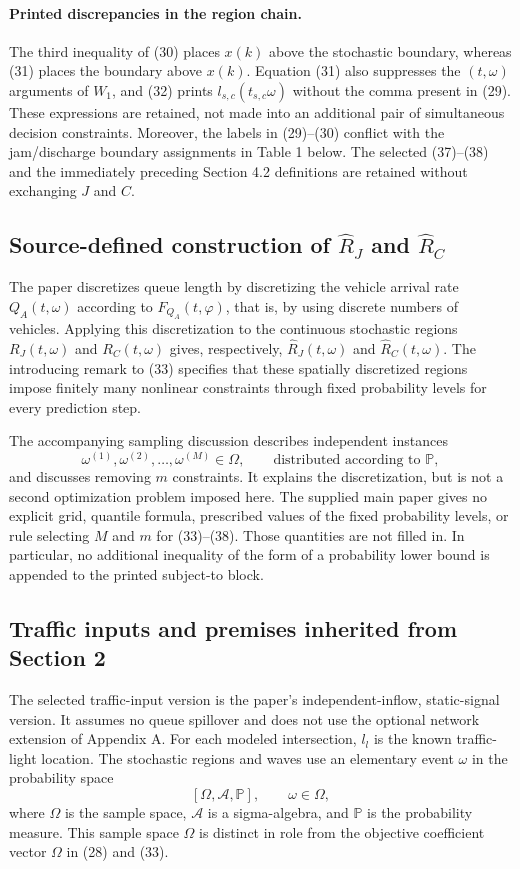 \documentclass{article}
\begin{document}
\paragraph{Printed discrepancies in the region chain.}
The third inequality of (30) places \(x(k)\) above the stochastic boundary, whereas (31) places the boundary above \(x(k)\). Equation (31) also suppresses the \((t,\omega)\) arguments of \(W_1\), and (32) prints \(l_{s,c}(t_{s,c}\omega)\) without the comma present in (29). These expressions are retained, not made into an additional pair of simultaneous decision constraints. Moreover, the labels in (29)--(30) conflict with the jam/discharge boundary assignments in Table 1 below. The selected (37)--(38) and the immediately preceding Section 4.2 definitions are retained without exchanging \(J\) and \(C\).

\subsection*{Source-defined construction of \(\hat R_J\) and \(\hat R_C\)}
The paper discretizes queue length by discretizing the vehicle arrival rate \(Q_A(t,\omega)\) according to \(F_{Q_A}(t,\varphi)\), that is, by using discrete numbers of vehicles. Applying this discretization to the continuous stochastic regions \(R_J(t,\omega)\) and \(R_C(t,\omega)\) gives, respectively, \(\hat R_J(t,\omega)\) and \(\hat R_C(t,\omega)\). The introducing remark to (33) specifies that these spatially discretized regions impose finitely many nonlinear constraints through fixed probability levels for every prediction step.

The accompanying sampling discussion describes independent instances
\[
\omega^{(1)},\omega^{(2)},\ldots,\omega^{(M)}\in\Omega,
\qquad\text{distributed according to }\mathbb P,
\]
and discusses removing \(m\) constraints. It explains the discretization, but is not a second optimization problem imposed here. The supplied main paper gives no explicit grid, quantile formula, prescribed values of the fixed probability levels, or rule selecting \(M\) and \(m\) for (33)--(38). Those quantities are not filled in. In particular, no additional inequality of the form of a probability lower bound is appended to the printed subject-to block.

\subsection*{Traffic inputs and premises inherited from Section 2}
The selected traffic-input version is the paper's independent-inflow, static-signal version. It assumes no queue spillover and does not use the optional network extension of Appendix A. For each modeled intersection, \(l_l\) is the known traffic-light location. The stochastic regions and waves use an elementary event \(\omega\) in the probability space
\[
[\Omega,\mathcal A,\mathbb P],\qquad \omega\in\Omega,
\]
where \(\Omega\) is the sample space, \(\mathcal A\) is a sigma-algebra, and \(\mathbb P\) is the probability measure. This sample space \(\Omega\) is distinct in role from the objective coefficient vector \(\Omega\) in (28) and (33).
\end{document}
